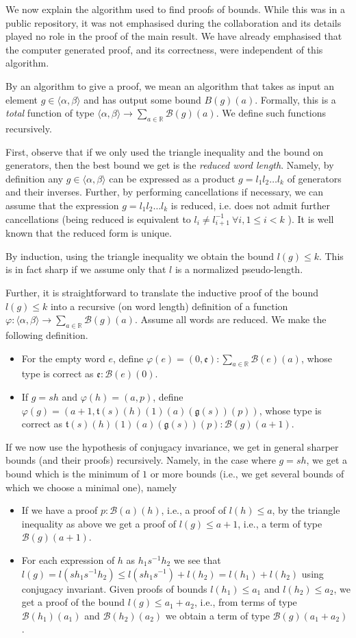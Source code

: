 \documentclass{amsart}
\theoremstyle{plain}
\theoremstyle{definition}
\theoremstyle{remark}
\newcommand{\R}{\mathbb{R}}
\newcommand{\F}{\langle \alpha, \beta \rangle}
\newcommand{\g}{\mathfrak{g}}
\renewcommand{\t}{\mathfrak{t}}
\newcommand{\e}{\mathfrak{e}}
\newcommand{\B}{\mathcal{B}}
\begin{document}
We now explain the algorithm used to find proofs of bounds. While this was in a public repository, it was not emphasised during the collaboration and its details played no role in the proof of the main result. We have already emphasised that the computer generated proof, and its correctness, were independent of this algorithm.

By an algorithm to give a proof, we mean an algorithm that takes as input an element $g\in\F$ and has output some bound $B(g)(a)$. Formally, this is a \emph{total} function of type $\F \to \sum_{a\in\R}\B(g)(a)$. We define such functions recursively.

First, observe that if we only used the triangle inequality and the bound on generators, then the best bound we get is the \emph{reduced word length}. Namely, by definition any $g\in\F$ can be expressed as a product $g=l_1l_2\dots l_k$ of generators and their inverses. Further, by performing cancellations if necessary, we can assume that the expression $g=l_1l_2\dots l_k$ is reduced, i.e. does not admit further cancellations (being reduced is equivalent to $l_i\neq l_{i+1}^{-1}\ \forall i, 1\leq i <k$ ). It is well known that the reduced form is unique.

By induction, using the triangle inequality we obtain the bound $l(g)\leq k$. This is in fact sharp if we assume only that $l$ is a normalized pseudo-length.

Further, it is straightforward to translate the inductive proof of the bound $l(g)\leq k$ into a recursive (on word length) definition of a function $\varphi: \F \to \sum_{a\in\R}\B(g)(a)$. Assume all words are reduced. We make the following definition.
\begin{itemize}
  \item For the empty word $e$, define $\varphi(e) = (0, \e): \sum_{a\in\R}\B(e)(a)$, whose type is correct as $\e : \B(e)(0)$.
  \item If $g=sh$ and $\varphi(h) = (a, p)$, define $\varphi(g) = (a + 1, \t(s)(h)(1)(a)(\g(s))(p))$, whose type is correct as $\t(s)(h)(1)(a)(\g(s))(p) : \B(g)(a + 1)$.
\end{itemize}

If we now use the hypothesis of conjugacy invariance, we get in general sharper bounds (and their proofs) recursively. Namely, in the case where $g=sh$, we get a bound which is the minimum of $1$ or more bounds (i.e., we get several bounds of which we choose a minimal one), namely
\begin{itemize}
  \item If we have a proof $p: \B(a)(h)$, i.e., a proof of $l(h)\leq a$, by the triangle inequality as above we get a proof of $l(g) \leq a + 1$, i.e., a term of type $\B(g)(a + 1)$.
  \item For each expression of $h$ as $h_1s^{-1}h_2$ we see that $l(g) = l(sh_1s^{-1}h_2) \leq l(sh_1s^{-1}) + l(h_2) = l(h_1) + l(h_2)$ using conjugacy invariant. Given proofs of bounds  $l(h_1)\leq a_1$ and $l(h_2)\leq a_2$, we get a proof of the bound $l(g)\leq a_1 + a_2$, i.e., from terms of type $\B(h_1)(a_1)$ and $\B(h_2)(a_2)$ we obtain a term of type $\B(g)(a_1+ a_2)$.
\end{itemize}
\end{document}
